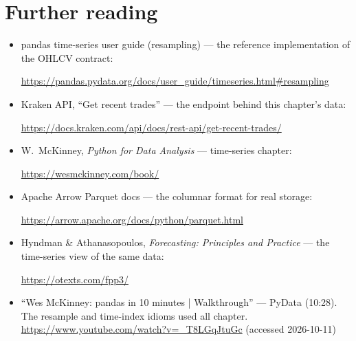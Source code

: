 \section*{Further reading}
\begin{itemize}
\item pandas time-series user guide (resampling) --- the reference implementation of the
OHLCV contract:

\url{https://pandas.pydata.org/docs/user_guide/timeseries.html#resampling}
\item Kraken API, ``Get recent trades'' --- the endpoint behind this chapter's data:

\url{https://docs.kraken.com/api/docs/rest-api/get-recent-trades/}
\item W.~McKinney, \emph{Python for Data Analysis} --- time-series chapter:

\url{https://wesmckinney.com/book/}
\item Apache Arrow Parquet docs --- the columnar format for real storage:

\url{https://arrow.apache.org/docs/python/parquet.html}
\item Hyndman \& Athanasopoulos, \emph{Forecasting: Principles and Practice} --- the
time-series view of the same data:

\url{https://otexts.com/fpp3/}
\end{itemize}

\begin{rulebox}
\begin{itemize}
\item ``Wes McKinney: pandas in 10 minutes | Walkthrough'' --- PyData (10:28). The resample
and time-index idioms used all chapter.
\url{https://www.youtube.com/watch?v=_T8LGqJtuGc} (accessed 2026-10-11)
\end{itemize}
\end{rulebox}

